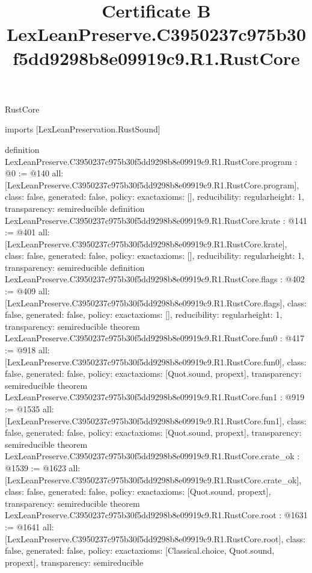 \begin{lexlean}{RustCore}
\title{Certificate B LexLeanPreserve.C3950237c975b30f5dd9298b8e09919c9.R1.RustCore}
\begin{coremodule}
imports [LexLeanPreservation.RustSound]

definition LexLeanPreserve.C3950237c975b30f5dd9298b8e09919c9.R1.RustCore.program : @0 := @140 {
  all: [LexLeanPreserve.C3950237c975b30f5dd9298b8e09919c9.R1.RustCore.program],
  class: false,
  generated: false,
  policy: exact{axioms: []},
  reducibility: regular{height: 1},
  transparency: semireducible
}
definition LexLeanPreserve.C3950237c975b30f5dd9298b8e09919c9.R1.RustCore.krate : @141 := @401 {
  all: [LexLeanPreserve.C3950237c975b30f5dd9298b8e09919c9.R1.RustCore.krate],
  class: false,
  generated: false,
  policy: exact{axioms: []},
  reducibility: regular{height: 1},
  transparency: semireducible
}
definition LexLeanPreserve.C3950237c975b30f5dd9298b8e09919c9.R1.RustCore.flags : @402 := @409 {
  all: [LexLeanPreserve.C3950237c975b30f5dd9298b8e09919c9.R1.RustCore.flags],
  class: false,
  generated: false,
  policy: exact{axioms: []},
  reducibility: regular{height: 1},
  transparency: semireducible
}
theorem LexLeanPreserve.C3950237c975b30f5dd9298b8e09919c9.R1.RustCore.fun0 : @417 := @918 {
  all: [LexLeanPreserve.C3950237c975b30f5dd9298b8e09919c9.R1.RustCore.fun0],
  class: false,
  generated: false,
  policy: exact{axioms: [Quot.sound, propext]},
  transparency: semireducible
}
theorem LexLeanPreserve.C3950237c975b30f5dd9298b8e09919c9.R1.RustCore.fun1 : @919 := @1535 {
  all: [LexLeanPreserve.C3950237c975b30f5dd9298b8e09919c9.R1.RustCore.fun1],
  class: false,
  generated: false,
  policy: exact{axioms: [Quot.sound, propext]},
  transparency: semireducible
}
theorem LexLeanPreserve.C3950237c975b30f5dd9298b8e09919c9.R1.RustCore.crate_ok : @1539 := @1623 {
  all: [LexLeanPreserve.C3950237c975b30f5dd9298b8e09919c9.R1.RustCore.crate_ok],
  class: false,
  generated: false,
  policy: exact{axioms: [Quot.sound, propext]},
  transparency: semireducible
}
theorem LexLeanPreserve.C3950237c975b30f5dd9298b8e09919c9.R1.RustCore.root : @1631 := @1641 {
  all: [LexLeanPreserve.C3950237c975b30f5dd9298b8e09919c9.R1.RustCore.root],
  class: false,
  generated: false,
  policy: exact{axioms: [Classical.choice, Quot.sound, propext]},
  transparency: semireducible
}


\end{coremodule}
\end{lexlean}
